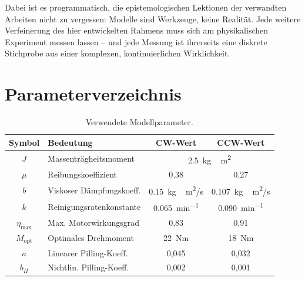 ﻿\documentclass[12pt,a4paper]{article}
\theoremstyle{remark}
\begin{document}
	Dabei ist es programmatisch, die epistemologischen Lektionen der verwandten Arbeiten
	\cite{epp2026digi, epp2026physd} nicht zu vergessen: Modelle sind Werkzeuge, keine
	Realität. Jede weitere Verfeinerung des hier entwickelten Rahmens muss sich am
	physikalischen Experiment messen lassen -- und jede Messung ist ihrerseits eine
	diskrete Stichprobe aus einer komplexen, kontinuierlichen Wirklichkeit.
	
	\appendix
	\section{Parameterverzeichnis}
	
	\begin{table}[H]
		\centering
		\caption{Verwendete Modellparameter.}
		\begin{tabular}{clcc}
			\toprule
			Symbol & Bedeutung & CW-Wert & CCW-Wert \\
			\midrule
			$J$             & Massenträgheitsmoment  & \multicolumn{2}{c}{\SI{2.5}{kg\,m^2}} \\
			$\mu$           & Reibungskoeffizient    & 0{,}38  & 0{,}27 \\
			$b$             & Viskoser Dämpfungskoeff.& \SI{0.15}{kg\,m^2/s} & \SI{0.107}{kg\,m^2/s} \\
			$k$             & Reinigungsratenkonstante & \SI{0.065}{min^{-1}} & \SI{0.090}{min^{-1}} \\
			$\eta_{\max}$   & Max. Motorwirkungsgrad & 0{,}83 & 0{,}91 \\
			$M_{\mathrm{opt}}$ & Optimales Drehmoment & \SI{22}{Nm} & \SI{18}{Nm} \\
			$a$             & Linearer Pilling-Koeff. & 0{,}045 & 0{,}032 \\
			$b_{\Pi}$       & Nichtlin. Pilling-Koeff. & 0{,}002 & 0{,}001 \\
			\bottomrule
		\end{tabular}
	\end{table}
	
\end{document}
